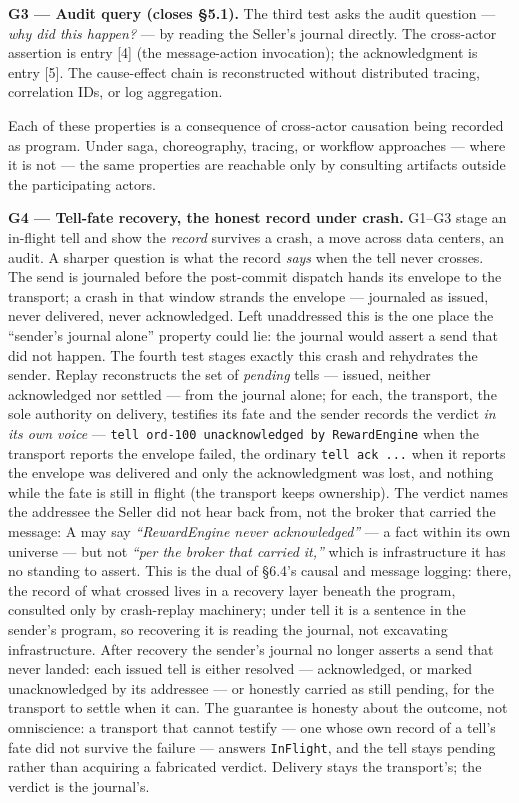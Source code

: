 \documentclass[
]{article}
\let\origtexttt\texttt%
\renewcommand{\texttt}[1]{\origtexttt{\seqsplit{#1}}}%
\let\texttt\origtexttt%
\begin{document}
\textbf{G3 --- Audit query (closes §5.1).} The third test asks the audit
question --- \emph{why did this happen?} --- by reading the Seller's
journal directly. The cross-actor assertion is entry {[}4{]} (the
message-action invocation); the acknowledgment is entry {[}5{]}. The
cause-effect chain is reconstructed without distributed tracing,
correlation IDs, or log aggregation.

Each of these properties is a consequence of cross-actor causation being
recorded as program. Under saga, choreography, tracing, or workflow
approaches --- where it is not --- the same properties are reachable
only by consulting artifacts outside the participating actors.

\textbf{G4 --- Tell-fate recovery, the honest record under crash.}
G1--G3 stage an in-flight tell and show the \emph{record} survives a
crash, a move across data centers, an audit. A sharper question is what
the record \emph{says} when the tell never crosses. The send is
journaled before the post-commit dispatch hands its envelope to the
transport; a crash in that window strands the envelope --- journaled as
issued, never delivered, never acknowledged. Left unaddressed this is
the one place the ``sender's journal alone'' property could lie: the
journal would assert a send that did not happen. The fourth test stages
exactly this crash and rehydrates the sender. Replay reconstructs the
set of \emph{pending} tells --- issued, neither acknowledged nor settled
--- from the journal alone; for each, the transport, the sole authority
on delivery, testifies its fate and the sender records the verdict
\emph{in its own voice} ---
\texttt{tell\ \textquotesingle{}ord-100\textquotesingle{}\ unacknowledged\ by\ RewardEngine}
when the transport reports the envelope failed, the ordinary
\texttt{tell\ ack\ ...} when it reports the envelope was delivered and
only the acknowledgment was lost, and nothing while the fate is still in
flight (the transport keeps ownership). The verdict names the addressee
the Seller did not hear back from, not the broker that carried the
message: A may say \emph{``RewardEngine never acknowledged''} --- a fact
within its own universe --- but not \emph{``per the broker that carried
it,''} which is infrastructure it has no standing to assert. This is the
dual of §6.4's causal and message logging: there, the record of what
crossed lives in a recovery layer beneath the program, consulted only by
crash-replay machinery; under tell it is a sentence in the sender's
program, so recovering it is reading the journal, not excavating
infrastructure. After recovery the sender's journal no longer asserts a
send that never landed: each issued tell is either resolved ---
acknowledged, or marked unacknowledged by its addressee --- or honestly
carried as still pending, for the transport to settle when it can. The
guarantee is honesty about the outcome, not omniscience: a transport
that cannot testify --- one whose own record of a tell's fate did not
survive the failure --- answers \texttt{InFlight}, and the tell stays
pending rather than acquiring a fabricated verdict. Delivery stays the
transport's; the verdict is the journal's.
\end{document}
